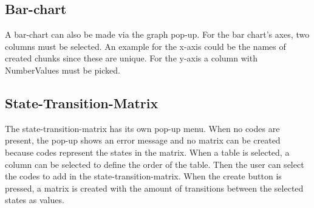 \subsection{Bar-chart}
A bar-chart can also be made via the graph pop-up. For the bar chart's axes, two columns must be selected. An example for the x-axis could be the names of created chunks since these are unique. For the y-axis a column with NumberValues must be picked. 
\subsection{State-Transition-Matrix}
The state-transition-matrix has its own pop-up menu. When no codes are present, the pop-up shows an error message and no matrix can be created because codes represent the states in the matrix. When a table is selected, a column can be selected to define the order of the table. Then the user can select the codes to add in the state-transition-matrix. When the create button is pressed, a matrix is created with the amount of transitions between the selected states as values.
